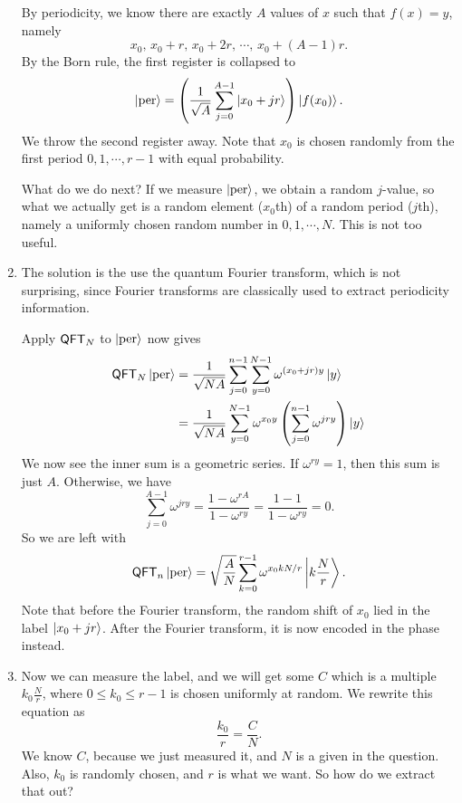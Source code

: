 \begin{eg}
\begin{enumerate}
      By periodicity, we know there are exactly $A$ values of $x$ such that $f(x) = y$, namely
      \[
        x_0,\, x_0 + r,\, x_0 + 2r,\, \cdots,\, x_0 + (A - 1)r.
      \]
      By the Born rule, the first register is collapsed to
      \[
        \left\lvert \mathrm{per}\right\rangle = \left(\frac{1}{\sqrt{A}} \sum_{j = 0}^{A - 1} \left\lvert x_0 + jr\right\rangle\right) \left\lvert f(x_0)\right\rangle.
      \]
      We throw the second register away. Note that $x_0$ is chosen randomly from the first period $0, 1, \cdots, r - 1$ with equal probability.

      What do we do next? If we measure $\left\lvert \mathrm{per}\right\rangle$, we obtain a random $j$-value, so what we actually get is a random element ($x_0$th) of a random period ($j$th), namely a uniformly chosen random number in $0, 1, \cdots, N$. This is not too useful.

    \item The solution is the use the quantum Fourier transform, which is not surprising, since Fourier transforms are classically used to extract periodicity information.

      Apply $\mathsf{QFT}_N$ to $\left\lvert \mathrm{per}\right\rangle$ now gives
      \begin{align*}
        \mathsf{QFT}_N \left\lvert \mathrm{per}\right\rangle &= \frac{1}{\sqrt{NA}} \sum_{j = 0}^{n - 1} \sum_{y = 0}^{N - 1} \omega^{(x_0 + jr) y} \left\lvert y\right\rangle\\
        &= \frac{1}{\sqrt{NA}} \sum_{y = 0}^{N - 1} \omega^{x_0 y}\left(\sum_{j = 0}^{n - 1}\omega^{jry}\right) \left\lvert y\right\rangle
      \end{align*}
      We now see the inner sum is a geometric series. If $\omega^{ry} = 1$, then this sum is just $A$. Otherwise, we have
      \[
        \sum_{j = 0}^{A - 1} \omega^{jry} = \frac{1 - \omega^{rA}}{1 - \omega^{ry}} = \frac{1 - 1}{1 - \omega^{ry}} = 0.
      \]
      So we are left with
      \[
        \mathsf{QFT}_n \left\lvert \mathrm{per}\right\rangle = \sqrt{\frac{A}{N}} \sum_{k = 0}^{r - 1}\omega ^{x_0 k N/r} \left\lvert k\frac{N}{r}\right\rangle.
      \]
      Note that before the Fourier transform, the random shift of $x_0$ lied in the label $\left\lvert x_0 + jr\right\rangle$. After the Fourier transform, it is now encoded in the phase instead.

    \item Now we can measure the label, and we will get some $C$ which is a multiple $k_0 \frac{N}{r}$, where $0 \leq k_0 \leq r - 1$ is chosen uniformly at random. We rewrite this equation as
      \[
        \frac{k_0}{r} = \frac{C}{N}.
      \]
      We know $C$, because we just measured it, and $N$ is a given in the question. Also, $k_0$ is randomly chosen, and $r$ is what we want. So how do we extract that out?


\end{enumerate}
\end{eg}
